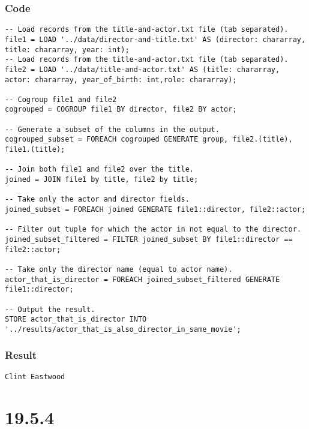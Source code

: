 \documentclass[a4paper, notitlepage]{article}
\begin{document}
\subsubsection{Code}

\begin{lstlisting}
-- Load records from the title-and-actor.txt file (tab separated).
file1 = LOAD '../data/director-and-title.txt' AS (director: chararray, title: chararray, year: int);
-- Load records from the title-and-actor.txt file (tab separated).
file2 = LOAD '../data/title-and-actor.txt' AS (title: chararray, actor: chararray, year_of_birth: int,role: chararray);

-- Cogroup file1 and file2
cogrouped = COGROUP file1 BY director, file2 BY actor;

-- Generate a subset of the columns in the output.
cogrouped_subset = FOREACH cogrouped GENERATE group, file2.(title), file1.(title);

-- Join both file1 and file2 over the title.
joined = JOIN file1 by title, file2 by title;

-- Take only the actor and director fields.
joined_subset = FOREACH joined GENERATE file1::director, file2::actor;

-- Filter out tuple for which the actor in not equal to the director.
joined_subset_filtered = FILTER joined_subset BY file1::director == file2::actor;

-- Take only the director name (equal to actor name).
actor_that_is_director = FOREACH joined_subset_filtered GENERATE file1::director;

-- Output the result.
STORE actor_that_is_director INTO '../results/actor_that_is_also_director_in_same_movie';
\end{lstlisting}

\subsubsection{Result}

\begin{lstlisting}
Clint Eastwood
\end{lstlisting}

\section{19.5.4}
\end{document}
